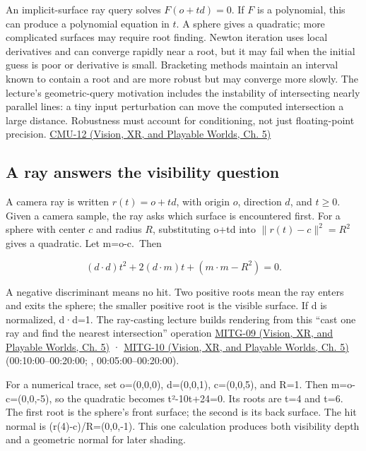 An implicit-surface ray query solves \(F(o+td)=0\). If \(F\) is a polynomial, this can produce a polynomial equation in \(t\). A sphere gives a quadratic; more complicated surfaces may require root finding. Newton iteration uses local derivatives and can converge rapidly near a root, but it may fail when the initial guess is poor or derivative is small. Bracketing methods maintain an interval known to contain a root and are more robust but may converge more slowly. The lecture's geometric-query motivation includes the instability of intersecting nearly parallel lines: a tiny input perturbation can move the computed intersection a large distance. Robustness must account for conditioning, not just floating-point precision. \href{../07-Vision-XR-and-Playable-Worlds/main.pdf\#nameddest=04-visual-computing-ii-ch036-cmu-12---geometric-queries}{CMU-12 (Vision, XR, and Playable Worlds, Ch. 5)}

\subsection{A ray answers the visibility question}\label{04-visual-computing-ii-ch028-a-ray-answers-the-visibility-question}

A camera ray is written \(r(t)=o+td\), with origin \(o\), direction \(d\), and \(t\ge0\). Given a camera sample, the ray asks which surface is encountered first. For a sphere with center \(c\) and radius \(R\), substituting o+td into \(\|r(t)-c\|^2=R^2\) gives a quadratic. Let m=o-c.~Then

\[
(d\cdot d)t^2+2(d\cdot m)t+(m\cdot m-R^2)=0.
\]

A negative discriminant means no hit. Two positive roots mean the ray enters and exits the sphere; the smaller positive root is the visible surface. If d is normalized, d·d=1. The ray-casting lecture builds rendering from this ``cast one ray and find the nearest intersection'' operation \href{../07-Vision-XR-and-Playable-Worlds/main.pdf\#nameddest=04-visual-computing-ii-ch036-mitg-09---ray-casting}{MITG-09 (Vision, XR, and Playable Worlds, Ch. 5)} · \href{../07-Vision-XR-and-Playable-Worlds/main.pdf\#nameddest=04-visual-computing-ii-ch036-mitg-10---ray-casting-ii}{MITG-10 (Vision, XR, and Playable Worlds, Ch. 5)} (00:10:00--00:20:00; , 00:05:00--00:20:00).

For a numerical trace, set o=(0,0,0), d=(0,0,1), c=(0,0,5), and R=1. Then m=o-c=(0,0,-5), so the quadratic becomes t²-10t+24=0. Its roots are t=4 and t=6. The first root is the sphere's front surface; the second is its back surface. The hit normal is (r(4)-c)/R=(0,0,-1). This one calculation produces both visibility depth and a geometric normal for later shading.

